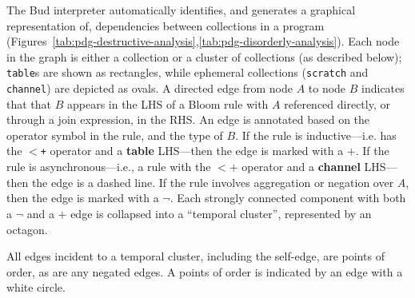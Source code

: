 The Bud interpreter automatically identifies, and generates a graphical
representation of, dependencies between collections in a program
(Figures~\ref{tab:pdg-destructive-analysis},\ref{tab:pdg-disorderly-analysis}).
Each node in the graph is either a collection or a cluster of collections (as
described below); \texttt{table}s are shown as rectangles, while ephemeral
collections (\texttt{scratch} and \texttt{channel}) are depicted as ovals.  A
directed edge from node $A$ to node $B$ indicates that that $B$ appears in the
LHS of a Bloom rule with $A$ referenced directly, or through a join expression,
in the RHS.  An edge is annotated based on the operator symbol in the rule, and
the type of $B$.  If the rule is inductive---i.e. has the \texttt{$<$+}
operator and a {\bf table} LHS---then the edge is marked with a $+$.  If the
rule is asynchronous---i.e., a rule with the \texttt{$<+$} operator and a {\bf
channel} LHS---then the edge is a dashed line.  If the rule involves
aggregation or negation over $A$, then the edge is marked with a $\lnot$.
Each strongly connected component with both a $\lnot$ and a $+$ edge is collapsed
into a ``temporal cluster'', represented by an octagon.

All edges incident to a temporal cluster, including the self-edge, are points
of order, as are any negated edges.
A points of order is indicated by an edge with a white circle.


